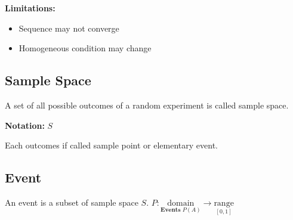 \documentclass[english,course]{lecture}
\begin{document}
\textbf{Limitations: }
\begin{itemize}
  \item Sequence may not converge 
  \item Homogeneous condition may change
\end{itemize}


\subsection{Sample Space}

A set of all possible outcomes of a random experiment is called sample space.

\textbf{Notation:} $S$

Each outcomes if called sample point or elementary event.

\subsection{Event}


An event is a subset of sample space $S$.
$P: \underset{\textbf{Events $P(A)$}}{\text{domain}} \rightarrow \underset{\textbf{$[0,1]$}}{\text{range}}$
\end{document}
